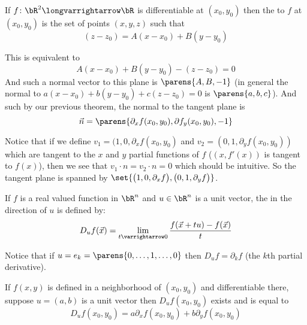 \documentclass[10pt]{article}
\begin{document}


\bigskip

\begin{defn*}

    If $f\colon\bR^2\longvarrightarrow\bR$ is differentiable at $(x_0,y_0)$ then the  to $f$ at $(x_0,y_0)$ is the set of points $(x,y,z)$ such that
    \[ (z-z_0) = A(x-x_0) + B(y-y_0) \]

\end{defn*}

This is equivalent to
\[ A(x-x_0) + B(y-y_0) - (z-z_0) = 0 \]
And such a normal vector to this plane is $\parens{A,B,-1}$ (in general the normal to $a(x-x_0)+b(y-y_0)+c(z-z_0)=0$ is $\parens{a,b,c}$).
And such by our previous theorem, the normal to the tangent plane is
\[ \vec n = \parens{\partial_x f(x_0,y_0), \partial f_y(x_0,y_0), -1} \]

Notice that if we define $v_1=(1,0,\partial_x f(x_0,y_0)$ and $v_2=(0,1,\partial_y f(x_0,y_0))$ which are tangent to the $x$ and $y$ partial functions of $f$ ($(x,f'(x))$ is tangent to $f(x)$), then we see
that $v_1\cdot n=v_2\cdot n=0$ which should be intuitive.
So the tangent plane is spanned by $\set{\bigl(1,0,\partial_x f\bigr), \bigl(0,1,\partial_y f\bigr)}$.

\begin{defn*}

    If $f$ is a real valued function in $\bR^n$ and $u\in\bR^n$ is a unit vector, the  in the direction of $u$ is defined by:
    \[ D_uf(\vec x) = \lim_{t\varrightarrow0}\frac{f(\vec x + tu) - f(\vec x)}t \]

\end{defn*}

Notice that if $u=e_k=\parens{0,\dots,1,\dots,0}$ then $D_u f=\partial_k f$ (the $k$th partial derivative).

\begin{prop*}

    If $f(x,y)$ is defined in a neighborhood of $(x_0,y_0)$ and differentiable there, suppose $u=(a,b)$ is a unit vector then $D_uf(x_0,y_0)$ exists and is equal to
    \[ D_uf(x_0,y_0) = a\partial_x f(x_0,y_0) + b\partial_y f(x_0,y_0) \]

\end{prop*}
\end{document}
